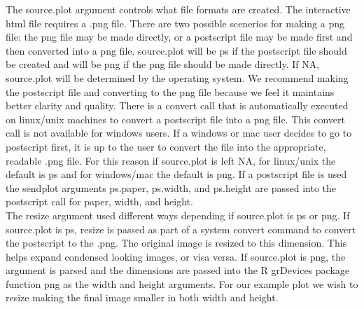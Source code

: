 \documentclass[]{article}
\begin{document}
\begin{Schunk}
\end{Schunk}
\quad The source.plot argument controls what file formats are created. The interactive html file requires a .png file. There are two possible scenerios for making a png file:
the png file may be made directly, or a postscript file may be made first and then converted into a png file. source.plot will be ps if the postscript file should be created and will be png if the png file should be made directly. If NA, source.plot will be determined by the operating system.  We recommend making the postscript file and converting to the png file because we feel it maintains better clarity and quality. There is a convert call that is automatically executed on linux/unix machines to convert a postscript file into a png file. This convert call is not available for windows users. If a windows or mac user decides to go to postscript first, it is up to the user to convert the file into the appropriate, readable .png file. For this reason if source.plot is left NA, for linux/unix the default is ps and for windows/mac the default is png. If a postscript file is used the sendplot arguments ps.paper, ps.width, and ps.height are passed into the postscript call for paper, width, and height.\\
\quad The resize argument used different ways depending if source.plot is ps or png. If source.plot is ps, resize is passed as part of a system convert command to convert the postscript to the .png. The original image is resized to this dimension. This helps expand condensed looking images, or visa versa. If source.plot is png, the argument is parsed and the dimensions are passed into the R grDevices package function png as the width and height arguments. For our example plot we wish to resize making the final image smaller in both width and height. 
\end{document}
